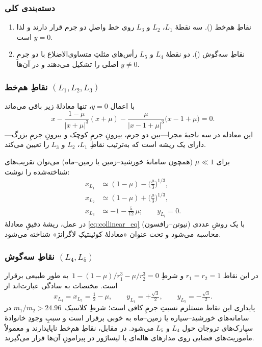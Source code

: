 \subsubsection{دسته‌بندی کلی}
\begin{enumerate}
	\item {نقاطِ هم‌خط ().} سه نقطهٔ $L_{1}$، $L_{2}$ و $L_{3}$ روی خط واصلِ دو جرم قرار دارند و لذا $y=0$ است.
	\item {نقاطِ سه‌گوش ().} دو نقطهٔ $L_{4}$ و $L_{5}$ رأس‌های مثلثِ متساوی‌الاضلاع با دو جرمِ اصلی را تشکیل می‌دهند و در آن‌ها $y\ne0$.
\end{enumerate}

\subsubsection{نقاطِ هم‌خط \texorpdfstring{$(L_{1},L_{2},L_{3})$}{(L1,L2,L3)}}\label{subsec:collinear}

با اعمال $y=0$، تنها معادلهٔ زیر باقی می‌ماند
\begin{equation}\label{eq:collinear_eq}
	x-\frac{1-\mu}{|x+\mu|^{3}}(x+\mu)-\frac{\mu}{|x-1+\mu|^{3}}\bigl(x-1+\mu\bigr)=0.
\end{equation}
این معادله در سه ناحیهٔ مجزا—بین دو جرم، بیرونِ جرمِ کوچک و بیرونِ جرمِ بزرگ—دارای یک ریشه است که به‌ترتیب نقاطِ $L_{1}$، $L_{2}$ و $L_{3}$ را تعیین می‌کند.

برای $\mu\ll1$ (همچون سامانهٔ خورشید–زمین یا زمین–ماه) می‌توان تقریب‌های شناخته‌شده را نوشت:
\begin{align*}
	x_{L_{1}} &\simeq (1-\mu)-\bigl(\tfrac{\mu}{3}\bigr)^{1/3},\\
	x_{L_{2}} &\simeq (1-\mu)+\bigl(\tfrac{\mu}{3}\bigr)^{1/3},\\
	x_{L_{3}} &\simeq -1-\tfrac{5}{12}\,\mu; \qquad y_{L_{i}}=0.
\end{align*}
در عمل، ریشهٔ دقیقِ معادلهٔ \eqref{eq:collinear_eq} با یک روشِ عددی (نیوتن–رافسون) محاسبه می‌شود و تحت عنوان «معادلهٔ کوئینتیکِ لاگرانژ» شناخته می‌شود\cite{battin1999astrodynamics}.

\subsubsection{نقاطِ سه‌گوش \texorpdfstring{$(L_{4},L_{5})$}{(L4,L5)}}\label{subsec:triangular}

در این نقاط $r_{1}=r_{2}=1$ و شرطِ
\(1-(1-\mu)/r_{1}^{3}-\mu/r_{2}^{3}=0\)\, به طور طبیعی برقرار است. مختصات به سادگی عبارت‌اند از
\begin{equation}
	x_{L_{4}}=x_{L_{5}}=\tfrac12-\mu,\qquad
	y_{L_{4}}=+\tfrac{\sqrt3}{2},\qquad
	y_{L_{5}}=-\tfrac{\sqrt3}{2}.
\end{equation}
پایداری این نقاط مستلزم نسبتِ جرمِ کافی است؛ شرطِ کلاسیک~$m_{1}/m_{2}>24.96$ در سامانه‌های خورشید–سیاره یا زمین–ماه به خوبی برقرار است و سببِ وجودِ خانوادهٔ سیارک‌های تروجان حول $L_{4}$ و $L_{5}$ می‌شود. در مقابل، نقاطِ هم‌خط ناپایدارند و معمولاً مأموریت‌های فضایی روی مدارهای هاله‌ای یا لیساژور در پیرامونِ آن‌ها قرار می‌گیرند.

